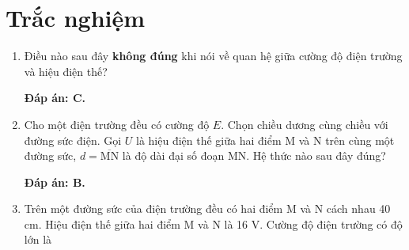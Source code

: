 \whiteBGstarBegin
\setcounter{section}{0}
\section{Trắc nghiệm}
\begin{enumerate}[label=\bfseries Câu \arabic*:]
	
	
	\item {}
	
	\cauhoi
	{Điều nào sau đây \textbf{không đúng} khi nói về quan hệ giữa cường độ điện trường và hiệu điện thế?
		
	}
	\loigiai
	{	\textbf{Đáp án: C.}
	
	}
	\item {}
	
	\cauhoi
	{Cho một điện trường đều có cường độ $E$. Chọn chiều dương cùng chiều với đường sức điện. Gọi $U$ là hiệu điện thế giữa hai điểm M và N trên cùng một đường sức, $d=\overline{\text{MN}}$ là độ dài đại số đoạn MN. Hệ thức nào sau đây đúng?
		
	}
	\loigiai
	{	\textbf{Đáp án: B.}
	
	}
	\item {}
	
	\cauhoi
	{Trên một đường sức của điện trường đều có hai điểm M và N cách nhau 40 cm. Hiệu điện thế giữa hai điểm M và N là 16 V. Cường độ điện trường có độ lớn là
		
}
\end{enumerate}
